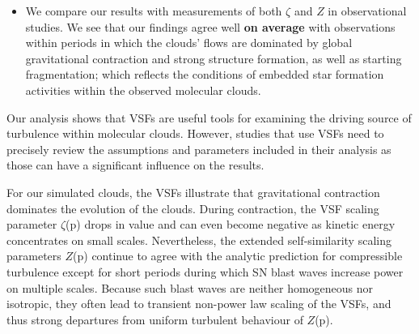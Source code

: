 \begin{itemize}
	\item We compare our results with measurements of both $\zeta$ and $Z$ in observational studies. We see that our findings agree well \textbf{on average} with observations within periods in which the clouds' flows are dominated by global gravitational contraction and strong structure formation, as well as starting fragmentation; which reflects the conditions of embedded star formation activities within the observed molecular clouds.
\end{itemize}

Our analysis shows that VSFs are useful tools for examining the driving source of turbulence within molecular clouds.
However, studies that use VSFs need to precisely review the assumptions and parameters included in their analysis as those can have a significant influence on the results.

For our simulated clouds, the VSFs illustrate that gravitational contraction dominates the evolution of the clouds.
During contraction, the VSF scaling parameter $\zeta$(p) drops in value and can even become negative as kinetic energy concentrates on small scales.
Nevertheless, the extended self-similarity scaling parameters $Z$(p) continue to agree with the analytic prediction for compressible turbulence except for short periods during which SN blast waves increase power on multiple scales.
Because such blast waves are neither homogeneous nor isotropic, they often lead to transient non-power law scaling of the VSFs, and thus strong departures from uniform turbulent behaviour of $Z$(p).



\endinput
